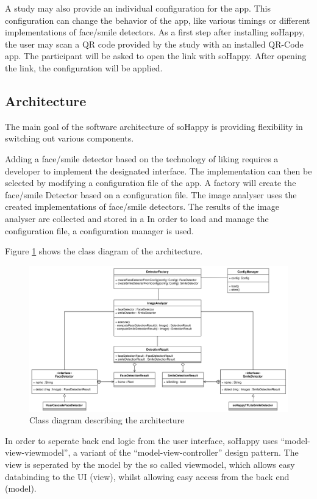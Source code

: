 A study may also provide an individual configuration for the app. This configuration
can change the behavior of the app, like various timings or different implementations
of face/smile detectors.
As a first step after installing soHappy, the user may scan a QR code provided
by the study with an installed QR-Code app. The participant will be asked to open the
link with soHappy. After opening the link, the configuration will be applied.

\subsection{Architecture}

The main goal of the software architecture of soHappy is providing flexibility 
in switching out various components.

Adding a face/smile detector based on the technology of liking requires a
developer to implement the designated interface. The implementation can then be 
selected by modifying a configuration file of the app. A factory will create 
the face/smile Detector based on a configuration file. 
The image analyser uses the created implementations of face/smile
detectors. The results of the image analyser are collected and stored in a
In order to load and manage the configuration file, a configuration manager 
is used.

Figure \ref{fig:arch1} shows the class diagram of the architecture.

\begin{figure}
    \includegraphics[width=\linewidth]{figures/methodology_architecture_1.png}
    \caption{Class diagram describing the architecture}
    \label{fig:arch1}
\end{figure}

In order to seperate back end logic from the user interface, soHappy uses
``model-view-viewmodel'', a variant of the ``model-view-controller'' design 
pattern. The view is seperated by the model by the so called viewmodel, which
allows easy databinding to the UI (view), whilst allowing easy access from the
back end (model). \cite{mvvm}

